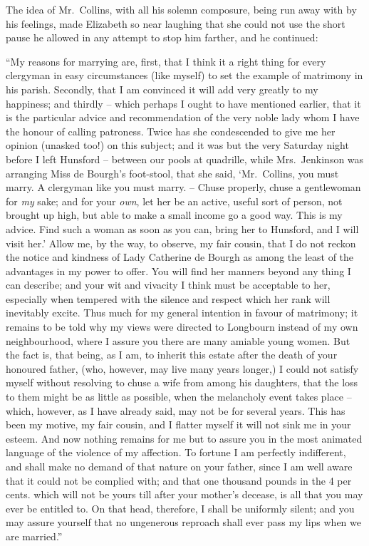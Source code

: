The idea of Mr.\ Collins, with all his solemn composure,
being run away with by his feelings, made Elizabeth so
near laughing that she could not use the short pause he
allowed in any attempt to stop him farther, and he
continued:

“My reasons for marrying are, first, that I think it
a right thing for every clergyman in easy circumstances
(like myself) to set the example of matrimony in his
parish. Secondly, that I am convinced it will add very
greatly to my happiness; and thirdly -- which perhaps
I ought to have mentioned earlier, that it is the particular
advice and recommendation of the very noble lady whom
I have the honour of calling patroness. Twice has she
condescended to give me her opinion (unasked too!) on
this subject; and it was but the very Saturday night
before I left Hunsford -- between our pools at quadrille,
while Mrs.\ Jenkinson was arranging Miss de Bourgh’s
foot-stool, that she said, ‘Mr.\ Collins, you must marry.
A clergyman like you must marry. -- Chuse properly, chuse
a gentlewoman for \textit{my} sake; and for your \textit{own}, let her
be an active, useful sort of person, not brought up high,
but able to make a small income go a good way. This is
my advice. Find such a woman as soon as you can, bring
her to Hunsford, and I will visit her.’ Allow me, by the
way, to observe, my fair cousin, that I do not reckon
the notice and kindness of Lady Catherine de Bourgh
as among the least of the advantages in my power to
offer. You will find her manners beyond any thing I can
describe; and your wit and vivacity I think must be
acceptable to her, especially when tempered with the
silence and respect which her rank will inevitably excite.
Thus much for my general intention in favour of matrimony;
it remains to be told why my views were directed
to Longbourn instead of my own neighbourhood, where
I assure you there are many amiable young women.
But the fact is, that being, as I am, to inherit this estate
after the death of your honoured father, (who, however,
may live many years longer,) I could not satisfy myself
without resolving to chuse a wife from among his daughters,
that the loss to them might be as little as possible, when
the melancholy event takes place -- which, however, as
I have already said, may not be for several years. This
has been my motive, my fair cousin, and I flatter myself
it will not sink me in your esteem. And now nothing
remains for me but to assure you in the most animated
language of the violence of my affection. To fortune I am
perfectly indifferent, and shall make no demand of that
nature on your father, since I am well aware that it could
not be complied with; and that one thousand pounds
in the 4 per cents. which will not be yours till after your
mother’s decease, is all that you may ever be entitled to.
On that head, therefore, I shall be uniformly silent; and
you may assure yourself that no ungenerous reproach
shall ever pass my lips when we are married.”

